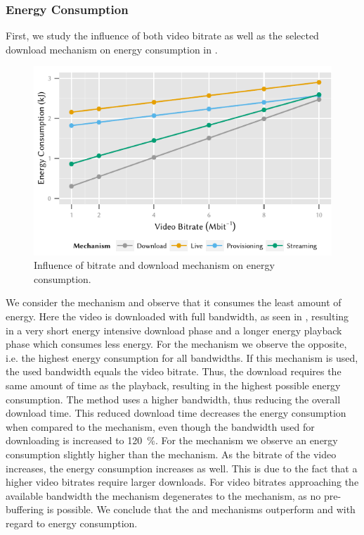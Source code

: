 \subsubsection*{Energy Consumption}\label{sec:application:lte_video:numerical_evaluation:energy_consumption}
First, we study the influence of both video bitrate as well as the selected download mechanism on energy consumption in .
\begin{figure}
  \centering
  \includegraphics{application/lte_video/numerical_evaluation/figures/bitrate2energy}
  \caption{Influence of bitrate and download mechanism on energy consumption.}
  \label{fig:application:lte_video:numerical_evaluation:energy_consumption:bitrate2energy}
\end{figure}

We consider the \download mechanism and observe that it consumes the least amount of energy.
Here the video is downloaded with full bandwidth, as seen in , resulting in a very short energy intensive download phase and a longer energy playback phase which consumes less energy.
For the \live mechanism we observe the opposite, i.e. the highest energy consumption for all bandwidths.
If this mechanism is used, the used bandwidth equals the video bitrate.
Thus, the download requires the same amount of time as the playback, resulting in the highest possible energy consumption.
The \serviceprovisioning method uses a higher bandwidth, thus reducing the overall download time.
This reduced download time decreases the energy consumption when compared to the \live mechanism, even though the bandwidth used for downloading is increased to \SI{120}{\percent}.
For the \streaming mechanism we observe an energy consumption slightly higher than the \download mechanism.
As the bitrate of the video increases, the energy consumption increases as well.
This is due to the fact that a higher video bitrates require larger downloads.
For video bitrates approaching the available bandwidth the \streaming mechanism degenerates to the \live mechanism, as no pre-buffering is possible.
We conclude that the \download and \streaming mechanisms outperform \live and \serviceprovisioning with regard to energy consumption.


